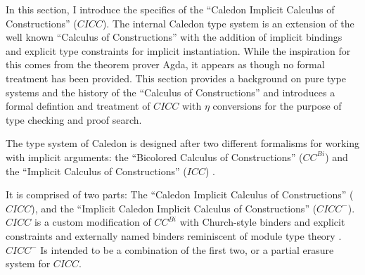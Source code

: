 In this section, I introduce the specifics of the ``Caledon Implicit Calculus of Constructions'' ($CICC$).
The internal Caledon type system is an extension of the well known ``Calculus of Constructions'' with the 
addition of implicit bindings and explicit type constraints for implicit instantiation.  
While the inspiration for this comes from the theorem prover Agda, 
it appears as though no formal treatment
has been provided. This section provides a background on pure type systems 
and the history of the ``Calculus of Constructions''
and introduces a formal defintion and treatment of $CICC$ with 
$\eta$ conversions for the purpose of type checking
and proof search.

The type system of Caledon is designed after two different formalisms for working with implicit arguments:  
the ``Bicolored Calculus of Constructions'' ($CC^{Bi}$) \citep{luther2001more} and 
the ``Implicit Calculus of Constructions'' ($ICC$) \citep{miquel2001implicit}.

It is comprised of two parts: The ``Caledon Implicit Calculus of Constructions'' ($CICC$), 
and the ``Implicit Caledon Implicit Calculus of Constructions'' ($CICC^-$). 
$CICC$ is a custom modification of $CC^{Bi}$ with Church-style binders and explicit constraints and 
externally named binders
reminiscent of module type theory \citep{dreyer2003type}.
$CICC^-$ Is intended to be a combination of the first two, or a partial 
erasure system for $CICC$. 
